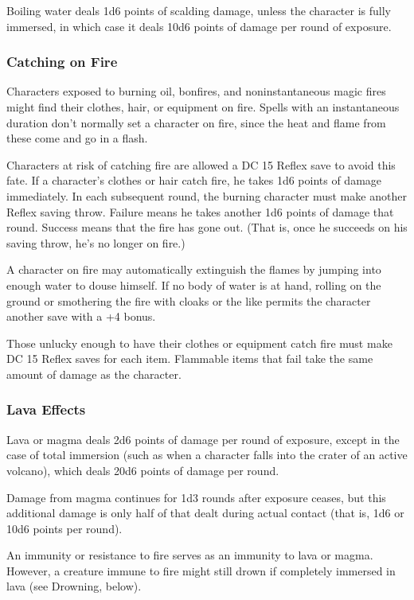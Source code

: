 Boiling water deals 1d6 points of scalding damage, unless the character is fully 
immersed, in which case it deals 10d6 points of damage per round of exposure.

\subsubsection{Catching on Fire}

Characters exposed to burning oil, bonfires, and noninstantaneous magic fires 
might find their clothes, hair, or equipment on fire. Spells with an instantaneous 
duration don't normally set a character on fire, since the heat and flame 
from these come and go in a flash.

Characters at risk of catching fire are allowed a DC 15 Reflex save to avoid this 
fate. If a character's clothes or hair catch fire, he takes 1d6 points of damage 
immediately. In each subsequent round, the burning character must make another 
Reflex saving throw. Failure means he takes another 1d6 points of damage that round. 
Success means that the fire has gone out. (That is, once he succeeds on his saving 
throw, he's no longer on fire.)

A character on fire may automatically extinguish the flames by jumping into enough 
water to douse himself. If no body of water is at hand, rolling on the ground or 
smothering the fire with cloaks or the like permits the character another save 
with a +4 bonus.

Those unlucky enough to have their clothes or equipment catch fire must make DC 
15 Reflex saves for each item. Flammable items that fail take the same amount of 
damage as the character.

\subsubsection{Lava Effects}

Lava or magma deals 2d6 points of damage per round of exposure, except in the case 
of total immersion (such as when a character falls into the crater of an active 
volcano), which deals 20d6 points of damage per round.

Damage from magma continues for 1d3 rounds after exposure ceases, but this additional 
damage is only half of that dealt during actual contact (that is, 1d6 or 10d6 points 
per round).

An immunity or resistance to fire serves as an immunity to lava or magma. However, 
a creature immune to fire might still drown if completely immersed in lava (see 
Drowning, below).

